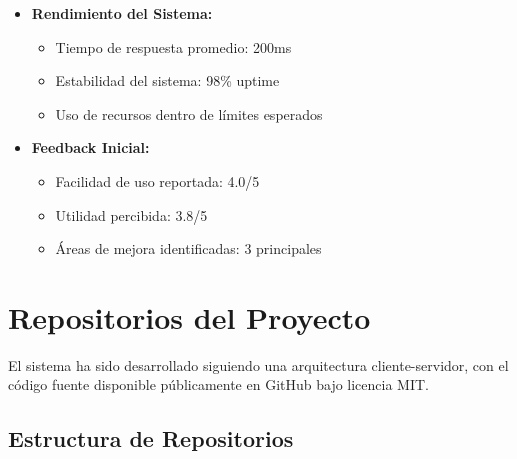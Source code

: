 \begin{itemize}
    \item \textbf{Rendimiento del Sistema:}
    \begin{itemize}
        \item Tiempo de respuesta promedio: 200ms
        \item Estabilidad del sistema: 98\% uptime
        \item Uso de recursos dentro de límites esperados
    \end{itemize}

    \item \textbf{Feedback Inicial:}
    \begin{itemize}
        \item Facilidad de uso reportada: 4.0/5
        \item Utilidad percibida: 3.8/5
        \item Áreas de mejora identificadas: 3 principales
    \end{itemize}
\end{itemize}

\section{Repositorios del Proyecto}
\label{repositorios-proyecto}

El sistema ha sido desarrollado siguiendo una arquitectura cliente-servidor, con el código fuente disponible públicamente en GitHub bajo licencia MIT.

\subsection{Estructura de Repositorios}
\label{estructura-repositorios}

